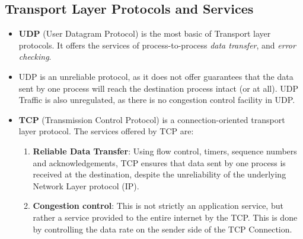 \documentclass{article}
\theoremstyle{plain}
\theoremstyle{definition}
\begin{document}
\subsection{Transport Layer Protocols and Services}
\begin{itemize}
    \item \textbf{UDP} (User Datagram Protocol) is the most basic of Transport layer protocols. It offers the services of process-to-process \textit{data transfer}, and \textit{error checking}.
    
    \item UDP is an unreliable protocol, as it does not offer guarantees that the data sent by one process will reach the destination process intact (or at all). UDP Traffic is also unregulated, as there is no congestion control facility in UDP. 
    
    \item \textbf{TCP} (Transmission Control Protocol) is a connection-oriented transport layer protocol. The services offered by TCP are:
    \begin{enumerate}
        \item \textbf{Reliable Data Transfer}: Using flow control, timers, sequence numbers and acknowledgements, TCP ensures that data sent by one process is received at the destination, despite the unreliability of the underlying Network Layer protocol (IP). 
        
        \item \textbf{Congestion control}: This is not strictly an application service, but rather a service provided to the entire internet by the TCP. This is done by controlling the data rate on the sender side of the TCP Connection. 
    \end{enumerate}
\end{itemize}
\end{document}
